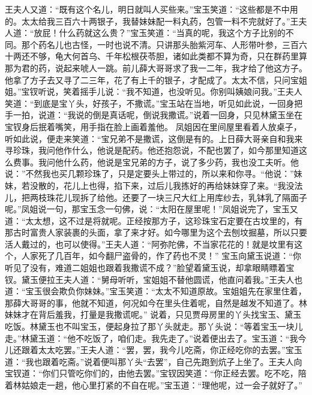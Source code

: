 \documentclass[12pt,oneside]{book}
\begin{document}
王夫人又道：“既有这个名儿，明日就叫人买些来。”宝玉笑道：“这些都是不中用的。太太给我三百六十两银子，我替妹妹配一料丸药，包管一料不完就好了。”王夫人道：“放屁！什么药就这么贵？”宝玉笑道：“当真的呢，我这个方子比别的不同。那个药名儿也古怪，一时也说不清。只讲那头胎紫河车、人形带叶参，三百六十两还不够，龟大何首乌、千年松根茯苓胆，诸如此类都不算为奇，只在群药里算那为君的药，说起来唬人一跳。前儿薛大哥哥求了我一二年，我才给了他这方子。他拿了方子去又寻了二三年，花了有上千的银子，才配成了。太太不信，只问宝姐姐。”宝钗听说，笑着摇手儿说：“我不知道，也没听见。你别叫姨娘问我。”王夫人笑道：“到底是宝丫头，好孩子，不撒谎。”宝玉站在当地，听见如此说，一回身把手一拍，说道：“我说的倒是真话呢，倒说我撒谎。”说着一回身，只见林黛玉坐在宝钗身后抿着嘴笑，用手指在脸上画着羞他。
凤姐因在里间屋里看着人放桌子，听如此说，便走来笑道：“宝兄弟不是撒谎，这倒是有的。上日薛大哥亲自和我来寻珍珠，我问他作什么，他说是配药。他还抱怨说，不配也罢了，如今那里知道这么费事。我问他什么药，他说是宝兄弟的方子，说了多少药，我也没工夫听。他说：”不然我也买几颗珍珠了，只是定要头上带过的，所以来和你寻。“他说：”妹妹，若没散的，花儿上也得，掐下来，过后儿我拣好的再给妹妹穿了来。“我没法儿，把两枝珠花儿现拆了给他。还要了一块三尺大红上用库纱去，乳钵乳了隔面子呢。”凤姐说一句，那宝玉念一句佛，说：“太阳在屋里呢！”凤姐说完了，宝玉又道：“太太想，这不过是将就呢。正经按那方子，这珍珠宝石定要在古坟里的，有那古时富贵人家装裹的头面，拿了来才好。如今哪里为这个去刨坟掘墓，所以只要活人戴过的，也可以使得。”王夫人道：“阿弥陀佛，不当家花花的！就是坟里有这个，人家死了几百年，如今翻尸盗骨的，作了药也不灵！”
宝玉向黛玉说道：“你听见了没有，难道二姐姐也跟着我撒谎不成？”脸望着黛玉说，却拿眼睛瞟着宝钗。黛玉便拉王夫人道：“舅母听听，宝姐姐不替他圆谎，他直问着我。”王夫人也道：“宝玉很会欺负你妹妹。”宝玉笑道：“太太不知道原故。宝姐姐先在家里住着，那薛大哥哥的事，他就不知道，何况如今在里头住着呢，自然是越发不知道了。林妹妹才在背后羞我，打量是我撒谎呢。”
说着，只见贾母房里的丫头找宝玉、黛玉吃饭。林黛玉也不叫宝玉，便起身拉了那丫头就走。那丫头说：“等着宝玉一块儿走。”林黛玉道：“他不吃饭了，咱们走。我先走了。”说着便出去了。宝玉道：“我今儿还跟着太太吃罢。”王夫人道：“罢，罢，我今儿吃斋，你正经吃你的去罢。”宝玉道：“我也跟着吃斋。”说着便叫那丫头“去罢”，自己先跑到炕子上坐了。王夫人向宝钗道：“你们只管吃你们的，由他去罢。”宝钗因笑道：“你正经去罢。吃不吃，陪着林姑娘走一趟，他心里打紧的不自在呢。”宝玉道：“理他呢，过一会子就好了。”
\end{document}
